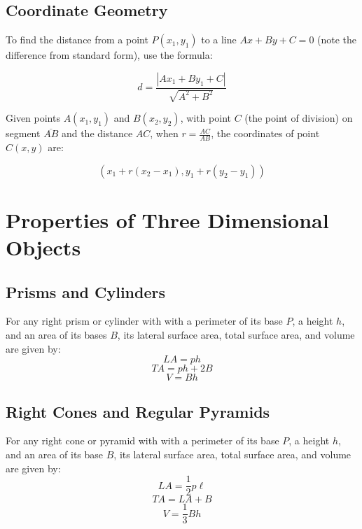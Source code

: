 \documentclass[final, letterpaper, 12pt]{article}
\begin{document}
	\subsection{Coordinate Geometry}\label{sec: ways of working with coordinates... in geometry}
		To find the distance from a point $P(x_1, y_1)$ to a line $Ax + By + C = 0$ (note the difference from standard form), use the formula:
		
		\begin{equation}
			d = \frac{|Ax_1 + By_1 + C|}{\sqrt{A^2 + B^2}}
		\end{equation}
		
		Given points $A(x_1,y_1)$ and $B(x_2,y_2)$, with point $C$ (the point of division) on segment $\overline{AB}$ and the distance $AC$, when $r = \frac{AC}{AB}$, the coordinates of point $C(x,y)$ are:
		
		\begin{equation}
			\left( x_1 + r (x_2 - x_1), y_1 + r (y_2 - y_1) \right)
		\end{equation}
		
\section{Properties of Three Dimensional Objects}
	\subsection{Prisms and Cylinders}\label{sec: simple formulae for the more simple objects}
		For any right prism or cylinder with with a perimeter of its base $P$, a height $h$, and an area of its bases $B$, its lateral surface area, total surface area, and volume are given by:
		\begin{equation}
			LA = ph
		\end{equation}
		\begin{equation}
			TA = ph+2B
		\end{equation}
		\begin{equation}
			V = Bh
		\end{equation}
	\subsection{Right Cones and Regular Pyramids}\label{sec: looking at the aspects of the pyramids/cones}
	For any right cone or pyramid with with a perimeter of its base $P$, a height $h$, and an area of its base $B$, its lateral surface area, total surface area, and volume are given by:
		\begin{equation}
			LA = \frac{1}{2}p\ell
		\end{equation}
		\begin{equation}
			TA = LA+B
		\end{equation}
		\begin{equation}
			V = \frac{1}{3}Bh
		\end{equation}
\end{document}

